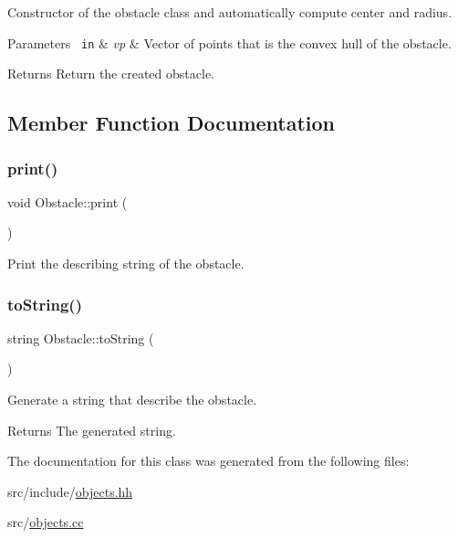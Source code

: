 Constructor of the obstacle class and automatically compute center and radius. 


\begin{DoxyParams}[1]{Parameters}
\mbox{\texttt{ in}}  & {\em vp} & Vector of points that is the convex hull of the obstacle. \\
\hline
\end{DoxyParams}
\begin{DoxyReturn}{Returns}
Return the created obstacle. 
\end{DoxyReturn}


\subsection{Member Function Documentation}
\mbox{\label{class_obstacle_a5484b8b93564f029d1e688b477be7d1d}} 
\subsubsection{\texorpdfstring{print()}{print()}}
{\footnotesize\ttfamily void Obstacle\+::print (\begin{DoxyParamCaption}{ }\end{DoxyParamCaption})}



Print the describing string of the obstacle. 

\mbox{\label{class_obstacle_aa2ed0727bded2b8a0265157fd298219e}} 
\subsubsection{\texorpdfstring{toString()}{toString()}}
{\footnotesize\ttfamily string Obstacle\+::to\+String (\begin{DoxyParamCaption}{ }\end{DoxyParamCaption})}



Generate a string that describe the obstacle. 

\begin{DoxyReturn}{Returns}
The generated string. 
\end{DoxyReturn}


The documentation for this class was generated from the following files\+:\begin{DoxyCompactItemize}
\item 
src/include/\mbox{\hyperlink{objects_8hh}{objects.\+hh}}\item 
src/\mbox{\hyperlink{objects_8cc}{objects.\+cc}}\end{DoxyCompactItemize}
